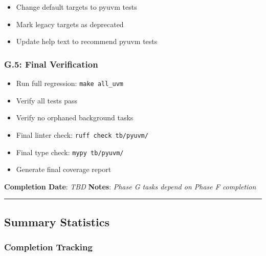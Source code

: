 \begin{record}

\begin{itemize}
\tightlist
\item[$\square$]
  Change default targets to pyuvm tests
\item[$\square$]
  Mark legacy targets as deprecated
\item[$\square$]
  Update help text to recommend pyuvm tests
\end{itemize}

\end{record}

\subsubsection{G.5: Final Verification}\label{cr:status:pyuvm-migration:g5-final-verification}

\begin{record}

\begin{itemize}
\tightlist
\item[$\square$]
  Run full regression: \texttt{make\ all\_\allowbreak{}uvm}
\item[$\square$]
  Verify all tests pass
\item[$\square$]
  Verify no orphaned background tasks
\item[$\square$]
  Final linter check:
  \texttt{ruff\ check\ tb/\allowbreak{}pyuvm/\allowbreak{}}
\item[$\square$]
  Final type check: \texttt{mypy\ tb/\allowbreak{}pyuvm/\allowbreak{}}
\item[$\square$]
  Generate final coverage report
\end{itemize}

\textbf{Completion Date}: \emph{TBD} \textbf{Notes}: \emph{Phase G tasks
depend on Phase F completion}

\begin{center}\rule{0.5\linewidth}{0.5pt}\end{center}

\end{record}

\subsection{Summary Statistics}\label{cr:status:pyuvm-migration:summary-statistics}

\subsubsection{Completion Tracking}\label{cr:status:pyuvm-migration:completion-tracking}

